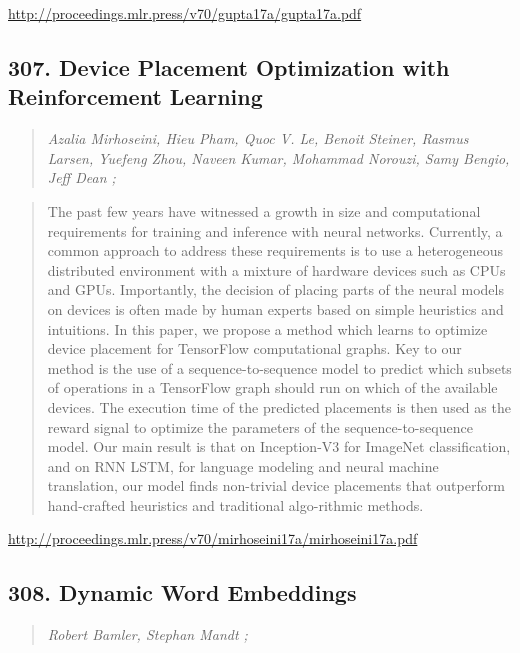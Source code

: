 \documentclass{article}
\begin{document}
\href{http://proceedings.mlr.press/v70/gupta17a/gupta17a.pdf}{http://proceedings.mlr.press/v70/gupta17a/gupta17a.pdf}

\subsection{307. Device Placement Optimization with Reinforcement Learning}

\begin{quote}
\footnotesize{\textit{Azalia Mirhoseini, Hieu Pham, Quoc V. Le, Benoit Steiner, Rasmus Larsen, Yuefeng Zhou, Naveen Kumar, Mohammad Norouzi, Samy Bengio, Jeff Dean ;}}
\end{quote}

\begin{quote}
    The past few years have witnessed a growth in size and computational requirements for training and inference with neural networks. Currently, a common approach to address these requirements is to use a heterogeneous distributed environment with a mixture of hardware devices such as CPUs and GPUs. Importantly, the decision of placing parts of the neural models on devices is often made by human experts based on simple heuristics and intuitions. In this paper, we propose a method which learns to optimize device placement for TensorFlow computational graphs. Key to our method is the use of a sequence-to-sequence model to predict which subsets of operations in a TensorFlow graph should run on which of the available devices. The execution time of the predicted placements is then used as the reward signal to optimize the parameters of the sequence-to-sequence model. Our main result is that on Inception-V3 for ImageNet classification, and on RNN LSTM, for language modeling and neural machine translation, our model finds non-trivial device placements that outperform hand-crafted heuristics and traditional algo-rithmic methods.  \end{quote}

\href{http://proceedings.mlr.press/v70/mirhoseini17a/mirhoseini17a.pdf}{http://proceedings.mlr.press/v70/mirhoseini17a/mirhoseini17a.pdf}

\subsection{308. Dynamic Word Embeddings}

\begin{quote}
\footnotesize{\textit{Robert Bamler, Stephan Mandt ;}}
\end{quote}
\end{document}
